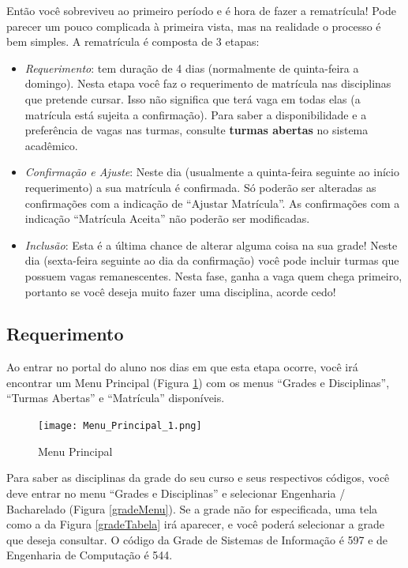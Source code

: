 \documentclass[a4paper,12pt,openany]{article}
\begin{document}
Então você sobreviveu ao primeiro período e é hora de fazer a rematrícula! Pode parecer um pouco complicada à primeira vista, mas na realidade o processo é bem simples. A rematrícula é composta de 3 etapas:

\begin{itemize}
\item \textit{Requerimento}: tem duração de 4 dias (normalmente de quinta-feira a domingo). Nesta etapa você faz o requerimento de matrícula nas disciplinas que pretende cursar. Isso não significa que terá vaga em todas elas (a matrícula está sujeita a confirmação). Para saber a disponibilidade e a preferência de vagas nas turmas, consulte \textbf{turmas abertas} no sistema acadêmico.

\item \textit {Confirmação e Ajuste}: Neste dia (usualmente a quinta-feira seguinte ao início requerimento) a sua matrícula é confirmada. Só poderão ser alteradas as confirmações com a indicação de ``Ajustar Matrícula''. As confirmações com a indicação ``Matrícula Aceita'' não poderão ser modificadas.

\item \textit{Inclusão}: Esta é a última chance de alterar alguma coisa na sua grade! Neste dia (sexta-feira seguinte ao dia da confirmação) você pode incluir turmas que possuem vagas remanescentes. Nesta fase, ganha a vaga quem chega primeiro, portanto se você deseja muito fazer uma disciplina, acorde cedo!

\end{itemize}

\subsection{Requerimento}

Ao entrar no portal do aluno nos dias em que esta etapa ocorre, você irá encontrar um Menu Principal (Figura \ref{menuPrincipal}) com os menus ``Grades e Disciplinas'', ``Turmas Abertas'' e ``Matrícula'' disponíveis.

	\begin{figure}[ht!]  \centering
		\texttt{[image: Menu\_Principal\_1.png]}
		\caption{Menu Principal}
		\label{menuPrincipal}
	\end{figure}

Para saber as disciplinas da grade do seu curso e seus respectivos códigos, você deve entrar no menu ``Grades e Disciplinas'' e selecionar Engenharia / Bacharelado  (Figura  \ref{gradeMenu}). Se a grade não for especificada, uma tela como a da Figura  \ref{gradeTabela} irá aparecer, e você poderá selecionar a grade que deseja consultar. O código da Grade de Sistemas de Informação é 597 e de Engenharia de Computação é 544.
\end{document}
